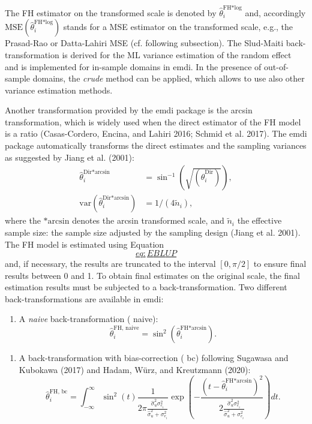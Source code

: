 The FH estimator on the transformed scale is denoted by
\(\hat{\theta}_i^{\text{FH*log}}\) and, accordingly
\(\text{MSE}(\hat{\theta}_i^{\text{FH*log}})\) stands for a MSE estimator
on the transformed scale, e.g., the Prasad-Rao or Datta-Lahiri MSE (cf.
following subsection). The Slud-Maiti back-transformation is derived for
the ML variance estimation of the random effect and is implemented for
in-sample domains in emdi. In the presence of out-of-sample domains, the
\emph{crude} method can be applied, which allows to use also other variance
estimation methods.

Another transformation provided by the emdi package is the arcsin
transformation, which is widely used when the direct estimator of the FH
model is a ratio (Casas-Cordero, Encina, and Lahiri 2016; Schmid et al. 2017). The emdi package
automatically transforms the direct estimates and the sampling variances
as suggested by Jiang et al. (2001): \[\begin{aligned}
\hat{\theta}_{i}^{\text{Dir*arcsin}} &=
\sin^{-1}\left(\sqrt{ \left(\hat{\theta}_{i}^{\text{Dir}}\right)}\right), \\
\text{var}\left(\hat{\theta}_{i}^{\text{Dir*arcsin}}\right) &= 1 / \left(4 \tilde{n}_i\right),
\end{aligned}\] where the \(\text{*arcsin}\) denotes the arcsin
transformed scale, and \(\tilde{n}_i\) the effective sample size: the
sample size adjusted by the sampling design (Jiang et al. 2001). The FH model
is estimated using
Equation~\protect\hyperlink{eq:EBLUP}{\[eq:EBLUP\]} and, if necessary, the results are truncated to
the interval \([0, \pi / 2]\) to ensure final results between 0 and 1. To
obtain final estimates on the original scale, the final estimation
results must be subjected to a back-transformation. Two different
back-transformations are available in emdi:

\begin{enumerate}
\def\labelenumi{\arabic{enumi}.}
\tightlist
\item
  A \emph{naive} back-transformation ( naive):
  \[\hat{\theta}^{\text{FH, naive}}_{i} =
      \sin^2 \left(\hat{\theta}^{\text{FH*arcsin}}_{i}\right).\]
\end{enumerate}

\begin{enumerate}
\def\labelenumi{\arabic{enumi}.}
\tightlist
\item
  A back-transformation with bias-correction ( bc) following
  Sugawasa and Kubokawa (2017) and Hadam, Würz, and Kreutzmann (2020):
  \[\hat{\theta}^{\text{FH, bc}}_{i} = \int_{- \infty}^{\infty} \sin^2 \left(t\right)
      \frac{1}{2 \pi \frac{\hat{\sigma}^2_u \sigma^2_{e_i}}{\hat{\sigma}^2_u +
              \sigma^2_{e_i}}} \exp \left( - \frac{\left(t - \hat{\theta}^{\text{FH*arcsin}}_i
          \right)^2}{2 \frac{\hat{\sigma}^2_u \sigma^2_{e_i}}{\hat{\sigma}^2_u +
              \sigma^2_{e_i}}} \right) dt.\]
\end{enumerate}

